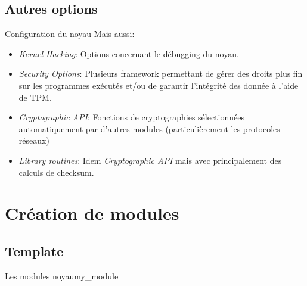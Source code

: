 \subsection{Autres options}

\begin{frame}[fragile=singleslide]{Configuration du noyau}
  Mais aussi:
  \begin{itemize}
  \item \emph{Kernel  Hacking}:  Options  concernant le  débugging  du
    noyau. %
  \item  \emph{Security  Options}:  Plusieurs framework  permettant  de
    gérer des  droits plus  fin sur les  programmes exécutés  et/ou de
    garantir l'intégrité des donnée à l'aide de TPM.
  \item   \emph{Cryptographic   API}:   Fonctions   de   cryptographies
    sélectionnées     automatiquement     par     d'autres     modules
    (particulièrement les protocoles réseaux)
  \item  \emph{Library routines}: Idem  \emph{Cryptographic API}  mais
    avec principalement des calculs de checksum.
  \end{itemize}
\end{frame}

\section{Création de modules}

\subsection{Template}

\begin{frame}[fragile=singleslide]{Les modules noyau}{my\_module}
  
\end{frame}


